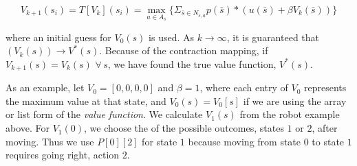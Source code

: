 \begin{equation}
\label{eq:policyiter-val-iteration}
V_{k+1}(s_i) = T[V_k](s_i) = \max_{a \in A_s} \{\Sigma_{\bar{s}\in N_{s,a}}p(\bar{s}) *\left( u(\bar{s}) + \beta V_k(\bar{s})\right)\}
\end{equation}

where an initial guess for $V_0(s)$ is used.
As $k \to \infty$, it is guaranteed that $(V_k(s)) \to V^*(s)$.
Because of the contraction mapping, if $V_{k+1}(s) = V_k(s) \, \, \forall \, s$, we have found the true value function, $V^*(s)$.


As an example, let $V_0 = [0,0,0,0]$ and $\beta = 1$, where each entry of $V_0$ represents the maximum value at that state, and $V_0(s) = V_0[s]$ if we are using the array or list form of the \emph{value function}.
We calculate $V_1(s)$ from the robot example above.
For $V_1(0)$, we choose the  of the possible outcomes, states $1$ or $2$, after moving.
Thus we use $P[0][2]$ for state $1$ because moving from state $0$ to state $1$ requires going right, action $2$.

